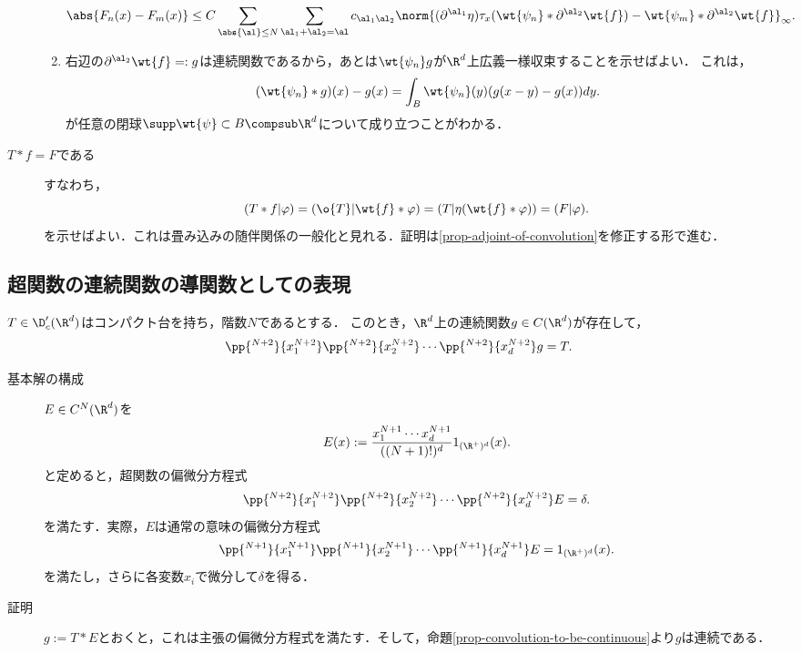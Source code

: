 \documentclass[uplatex,dvipdfmx]{jsreport}
\begin{document}
\begin{Proof}
\begin{description}
\begin{enumerate}[{Step}1]
            \[\abs{F_n(x)-F_m(x)}\le C\sum_{\abs{\al}\le N}\sum_{\al_1+\al_2=\al}c_{\al_1\al_2}\norm{(\partial^{\al_1}\eta)\tau_x(\wt{\psi_n}*\partial^{\al_2}\wt{f})-\wt{\psi_m}*\partial^{\al_2}\wt{f}}_\infty.\]
            \item 右辺の$\partial^{\al_2}\wt{f}=:g$は連続関数であるから，あとは$\wt{\psi_n}g$が$\R^d$上広義一様収束することを示せばよい．
            これは，
            \[(\wt{\psi_n}*g)(x)-g(x)=\int_B\wt{\psi_n}(y)(g(x-y)-g(x))dy.\]
            が任意の閉球$\supp\wt{\psi}\subset B\compsub\R^d$について成り立つことがわかる．
        \end{enumerate}
        \item[$T*f=F$である] すなわち，
        \[(T*f|\varphi)=(\o{T}|\wt{f}*\varphi)=(T|\eta(\wt{f}*\varphi))=(F|\varphi).\]
        を示せばよい．これは畳み込みの随伴関係の一般化と見れる．証明は\ref{prop-adjoint-of-convolution}を修正する形で進む．
    \end{description}
\end{Proof}

\subsection{超関数の連続関数の導関数としての表現}

\begin{theorem}[コンパクト台を持つ超関数は連続関数の微分である]
    $T\in\D'_c(\R^d)$はコンパクト台を持ち，階数$N$であるとする．
    このとき，$\R^d$上の連続関数$g\in C(\R^d)$が存在して，
    \[\pp{^{N+2}}{x_1^{N+2}}\pp{^{N+2}}{x_2^{N+2}}\cdots\pp{^{N+2}}{x_d^{N+2}}g=T.\]
\end{theorem}
\begin{Proof}\mbox{}
    \begin{description}
        \item[基本解の構成] $E\in C^N(\R^d)$を
        \[E(x):=\frac{x_1^{N+1}\cdots x_d^{N+1}}{((N+1)!)^d}1_{(\R^+)^d}(x).\] 
        と定めると，超関数の偏微分方程式
        \[\pp{^{N+2}}{x_1^{N+2}}\pp{^{N+2}}{x_2^{N+2}}\cdots\pp{^{N+2}}{x_d^{N+2}}E=\delta.\]
        を満たす．実際，$E$は通常の意味の偏微分方程式
        \[\pp{^{N+1}}{x_1^{N+1}}\pp{^{N+1}}{x_2^{N+1}}\cdots\pp{^{N+1}}{x_d^{N+1}}E=1_{(\R^+)^d}(x).\]
        を満たし，さらに各変数$x_i$で微分して$\delta$を得る．
        \item[証明] $g:=T*E$とおくと，これは主張の偏微分方程式を満たす．そして，命題\ref{prop-convolution-to-be-continuous}より$g$は連続である．
    \end{description}
\end{Proof}
\end{document}
